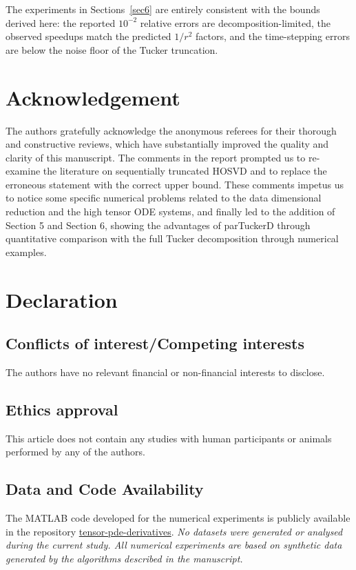 \documentclass[11pt, oneside]{article}  %
\begin{document}
The experiments in Sections~\ref{sec6} are entirely consistent with the bounds derived here: the reported $10^{-2}$ relative errors are 
decomposition-limited, the observed speedups match the predicted $1/r^2$ factors, and the time-stepping errors are below the noise floor of the Tucker truncation.
 

\vskip 5pt  
\section*{Acknowledgement}
The authors gratefully acknowledge the anonymous referees for their thorough and constructive reviews, which have substantially improved the 
quality and clarity of this manuscript.  The comments in the report prompted us to re-examine the literature on sequentially truncated HOSVD 
and to replace the erroneous statement with the correct upper bound. These comments impetus us to notice some specific numerical problems 
related to the data dimensional reduction and the high tensor ODE systems, and finally led to the addition of Section 5 and Section 6, showing 
the advantages of parTuckerD through quantitative comparison with the full Tucker decomposition through numerical examples.  


\section*{Declaration}

\subsection*{Conflicts of interest/Competing interests}
The authors have no relevant financial or non-financial interests to disclose. 

\subsection*{Ethics approval}
This article does not contain any studies with human participants or animals performed by any of the authors.

\subsection*{Data and Code Availability}
The MATLAB code developed for the numerical experiments is publicly available in the repository 
\href{https://github.com/yiran-xu40/tensor-pde-derivatives.git}{tensor-pde-derivatives}. 
\textit{No datasets were generated or analysed during the current study. All numerical experiments are based on synthetic data generated by the algorithms described in the manuscript.}
\end{document}
